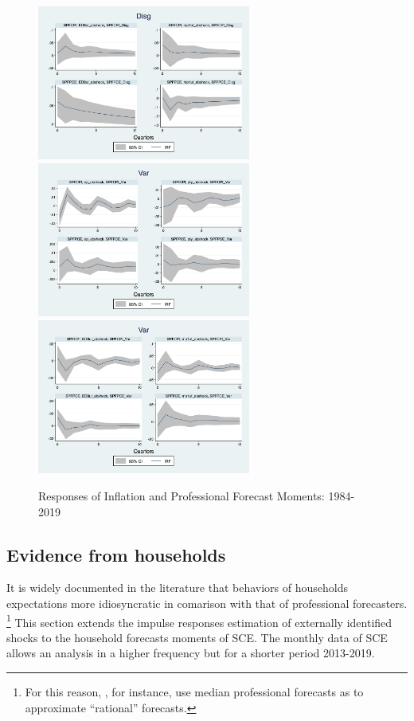\documentclass[]{article}
\begin{document}
\begin{figure}[ht]
	\includegraphics[width=7cm]{figures/SPFDisg_ab_ashocks.png} \\
	\smallskip 
	\includegraphics[width=7cm]{figures/SPFVar_ab_ashocks_nmp.png} 
	\includegraphics[width=7cm]{figures/SPFVar_ab_ashocks.png} 
	\caption{Responses of Inflation and Professional Forecast Moments: 1984-2019}
	\label{ReplicateCoibionwholeperiod}
\end{figure}


\subsection{Evidence from households}

It is widely documented in the literature that behaviors of households expectations more idiosyncratic in comarison with that of professional forecasters. \footnote{For this reason, \cite{carroll2003macroeconomic}, for instance, use median professional forecasts as to approximate ``rational'' forecasts.} This section extends the impulse responses estimation of externally identified shocks to the household forecasts moments of SCE.  The monthly data of SCE allows an analysis in a higher frequency but for a shorter period 2013-2019. 
\end{document}
